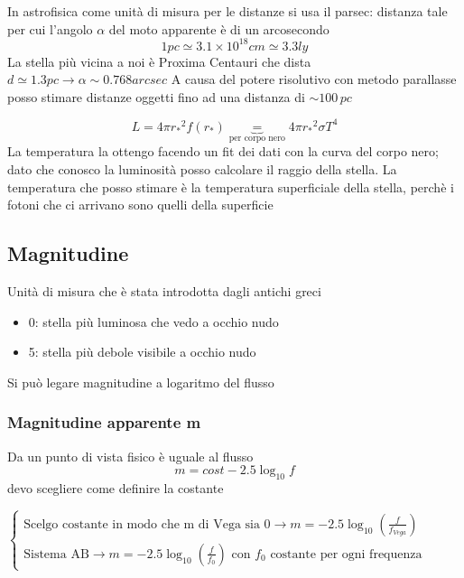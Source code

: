 \noindent In astrofisica come unità di misura per le distanze si usa il parsec: distanza tale per cui l'angolo $\alpha$ del moto apparente è di un arcosecondo
\begin{equation*}
    1 pc \simeq 3.1 \times 10^{18} cm \simeq 3.3 ly
\end{equation*}
La stella più vicina a noi è Proxima Centauri che dista $d \simeq 1.3 pc \rightarrow \alpha \sim 0.768 arcsec$ \newline
A causa del potere risolutivo con metodo parallasse posso stimare distanze oggetti fino ad una distanza di $\sim 100 \, pc$   

\begin{equation*}
    L =4\pi {r_*}^2 f(r_*) \underbrace{=}_{\text{per corpo nero}} 4\pi {r_*}^2 \sigma T^4
\end{equation*}
La temperatura la ottengo facendo un fit dei dati con la curva del corpo nero; dato che conosco la luminosità posso calcolare il raggio della stella. La temperatura che posso stimare è la temperatura superficiale della stella, perchè i fotoni che ci arrivano sono quelli della superficie

\subsection*{Magnitudine}
Unità di misura che è stata introdotta dagli antichi greci
\begin{itemize}
    \item 0: stella più luminosa che vedo a occhio nudo
    \item 5: stella più debole visibile a occhio nudo
\end{itemize}
Si può legare magnitudine a logaritmo del flusso

\subsubsection*{Magnitudine apparente m}
Da un punto di vista fisico è uguale al flusso
\begin{equation*}
    m = cost - 2.5 \log_{10}f
\end{equation*}
devo scegliere come definire la costante \newline

\noindent $\begin{cases}
    \text{Scelgo costante in modo che m di Vega sia 0} \rightarrow m = -2.5 \log_{10}\left(\frac{f}{f_{Vega}}\right) \\
    \text{Sistema AB} \rightarrow m = -2.5 \log_{10}\left(\frac{f}{f_0}\right) \text{ con $f_0$ costante per ogni frequenza}
\end{cases}$

